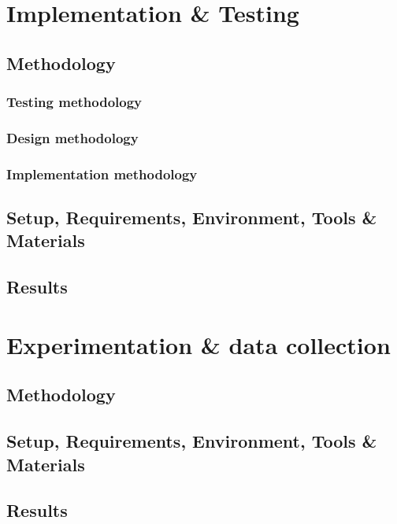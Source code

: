 \chapter{Implementation \& Testing}
\pagestyle{fancy}
\section{Methodology} %
\subsection{Testing methodology}
\subsection{Design methodology}
\subsection{Implementation methodology}
\section{Setup, Requirements, Environment, Tools \& Materials} %
\section{Results} %

\lipsum[1-5] 

\chapter{Experimentation \& data collection}
\pagestyle{fancy}
\section{Methodology} %
\section{Setup, Requirements, Environment, Tools \& Materials} %
\section{Results} %

\lipsum[1-5]